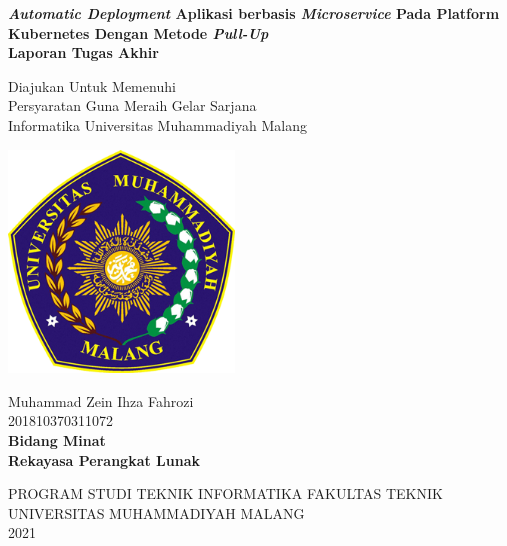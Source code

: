 \begin{titlepage}
    \begin{center}
        \onehalfspacing
        \large \bfseries \textit{Automatic Deployment}  Aplikasi berbasis \textit{Microservice} Pada Platform Kubernetes Dengan Metode \textit{Pull-Up} \\
        \vspace{1cm}
        \large Laporan Tugas Akhir \\
        \vspace{0.5cm}

        {\small \normalfont Diajukan Untuk Memenuhi\\
            Persyaratan Guna Meraih Gelar Sarjana\\
            Informatika Universitas Muhammadiyah Malang}
        \vspace{2cm}

        \includegraphics[width=6cm]{figures/logo_umm.png}

        \vspace{1cm}
        \normalfont \normalsize Muhammad Zein Ihza Fahrozi \\
        \normalfont \normalsize 201810370311072 \\

        \vspace{1cm}
        \bfseries \normalsize Bidang Minat \\
        \normalfont \normalsize Rekayasa Perangkat Lunak

        \vspace{2.5cm}

        \normalsize PROGRAM STUDI TEKNIK INFORMATIKA FAKULTAS TEKNIK \\
        UNIVERSITAS MUHAMMADIYAH MALANG \\
        2021



    \end{center}

\end{titlepage}

\newpage